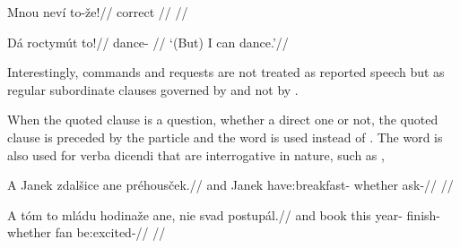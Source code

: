 
\pex
\begingl
\gla Mnou nev\'i to-\v{z}e!//
\glb correct  //
\glft {}//
\endgl
\xe

\pex
\begingl
\gla Dá roctymút to!//
\glb {} dance- //
\glft `(But) I can dance.'//
\endgl
\xe


Interestingly, commands and requests are not treated as reported speech but as regular subordinate clauses governed by  and not by .

When the quoted clause is a question, whether a direct one or not, the quoted clause is preceded by the particle  and the word  is used instead of . The word  is also used for verba dicendi that are interrogative in nature, such as ,

\pex
\begingl
  \gla A Janek zdal\v{s}ice ane pr\'ehous\v{c}ek.//
  \glb and Janek have:breakfast- whether ask-//
  \glft {}//
\endgl
\xe

\pex
\begingl
  \gla A t\'om to ml\'adu hodina\v{z}e ane, nie svad postup\'al.//
  \glb and book this year- finish- whether  fan be:excited-//
  \glft {}//
\endgl
\xe
